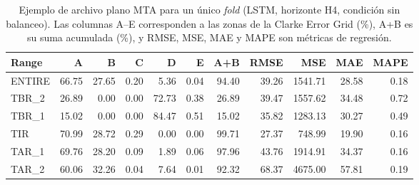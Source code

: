 \begin{table}[htbp]
\centering
\caption{Ejemplo de archivo plano MTA para un único \textit{fold} (LSTM, horizonte H4, condición sin balanceo). Las columnas A--E corresponden a las zonas de la Clarke Error Grid (\%), A+B es su suma acumulada (\%), y RMSE, MSE, MAE y MAPE son métricas de regresión.}
\label{tab:ejemplo_mta_fold}
\small
\begin{tabular}{lrrrrrrrrrr}
\toprule
\textbf{Range} & \textbf{A} & \textbf{B} & \textbf{C} & \textbf{D} & \textbf{E} & \textbf{A+B} & \textbf{RMSE} & \textbf{MSE} & \textbf{MAE} & \textbf{MAPE} \\
\midrule
ENTIRE & 66.75 & 27.65 & 0.20 & 5.36 & 0.04 & 94.40 & 39.26 & 1541.71 & 28.58 & 0.18 \\
TBR\_2 & 26.89 &  0.00 & 0.00 & 72.73 & 0.38 & 26.89 & 39.47 & 1557.62 & 34.48 & 0.72 \\
TBR\_1 & 15.02 &  0.00 & 0.00 & 84.47 & 0.51 & 15.02 & 35.82 & 1283.13 & 30.27 & 0.49 \\
TIR    & 70.99 & 28.72 & 0.29 &  0.00 & 0.00 & 99.71 & 27.37 &  748.99 & 19.90 & 0.16 \\
TAR\_1 & 69.76 & 28.20 & 0.09 &  1.89 & 0.06 & 97.96 & 43.76 & 1914.91 & 34.37 & 0.16 \\
TAR\_2 & 60.06 & 32.26 & 0.04 &  7.64 & 0.01 & 92.32 & 68.37 & 4675.00 & 57.81 & 0.19 \\
\bottomrule
\end{tabular}
\end{table}

